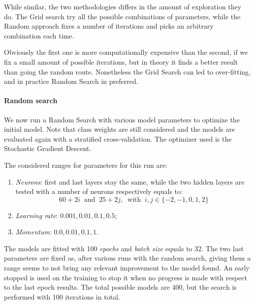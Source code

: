 While similar, the two methodologies differs in the amount of exploration they do.
The Grid search try all the possible combinations of parameters, while the 
Random approach fixes a number of iterations and picks an arbitrary combination each time. 

Obviously the first one is more computationally expensive than the second, if 
we fix a small amount of possible iterations, but in theory it finds a better result
than going the random route. 
Nonetheless the Grid Search can led to over-fitting, and in practice Random 
Search in preferred.

\paragraph{Random search}
We now run a Random Search with various model parameters 
to optimize the initial model.
Note that class weights are still considered and the models are evaluated
again with a stratified cross-validation.
The optimizer used is the Stochastic Gradient Descent.

The considered ranges for parameters for this run are: 
\begin{enumerate}
    \item \emph{Neurons}: first and last layers stay the same, while 
    the two hidden layers are tested with a number of neurons respectively 
    equals to: 
    $$60 + 2i\;\;\text{and}\;\;25 + 2j,\;\;\text{with}\;\; i, j \in \{-2,-1,0,1,2\}$$
    \item \emph{Learning rate}: $0.001, 0.01, 0.1, 0.5$;
    \item \emph{Momentum}: $0.0, 0.01, 0.1, 1$.
\end{enumerate}

The models are fitted with 100 \emph{epochs} and \emph{batch size} equals to 32.
The two last parameters are fixed as, after various runs with the random 
search, giving them a range seems to not bring any relevant 
improvement to the model found.
An early stopped is used on the training to stop it when no progress is made with 
respect to the last epoch results.
The total possible models are 400, but the search is performed with 100 iterations
in total.


